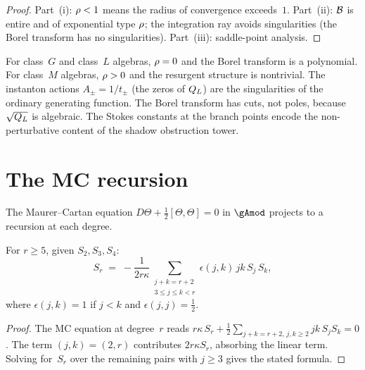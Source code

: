 \begin{proof}
Part~(i): $\rho < 1$ means the radius of convergence
exceeds~$1$. Part~(ii): $\mathcal{B}$ is entire and of exponential
type $\rho$; the integration ray avoids singularities
(the Borel transform has no singularities). Part~(iii):
saddle-point analysis.
\end{proof}

\begin{remark}
\label{rem:comp-borel-spectral}
For class~$G$ and class~$L$ algebras, $\rho = 0$ and
the Borel transform is a polynomial. For class~$M$ algebras,
$\rho > 0$ and the resurgent structure is nontrivial.
The instanton actions $A_\pm = 1/t_\pm$ (the zeros of
$Q_L$) are the singularities of the ordinary
generating function. The Borel transform has cuts, not poles,
because $\sqrt{Q_L}$ is algebraic. The Stokes
constants at the branch points encode the non-perturbative content
of the shadow obstruction tower.
\end{remark}


\section{The MC recursion}
\label{sec:comp-mc-recursion}

The Maurer--Cartan equation
$D\Theta + \frac{1}{2}[\Theta, \Theta] = 0$ in $\gAmod$ projects
to a recursion at each degree.

\begin{proposition}[MC recursion]
\label{prop:comp-mc-recursion}
\ClaimStatusProvedHere
For $r \geq 5$, given $S_2, S_3, S_4$:
\begin{equation}\label{eq:comp-mc-recursion}
 S_r \;=\; -\frac{1}{2r\kappa}
 \!\sum_{\substack{j+k = r+2 \\ 3 \leq j \leq k < r}}
 \!\!\epsilon(j,k)\, jk\, S_j\, S_k,
\end{equation}
where $\epsilon(j,k) = 1$ if $j < k$ and
$\epsilon(j,j) = \frac{1}{2}$.
\end{proposition}

\begin{proof}
The MC equation at degree~$r$ reads
$r\kappa\, S_r + \frac{1}{2}
\sum_{j+k = r+2,\, j,k \geq 2} jk\, S_j S_k = 0$.
The term $(j,k) = (2,r)$ contributes $2r\kappa S_r$, absorbing
the linear term. Solving for~$S_r$ over the remaining pairs
with $j \geq 3$ gives the stated formula.
\end{proof}

